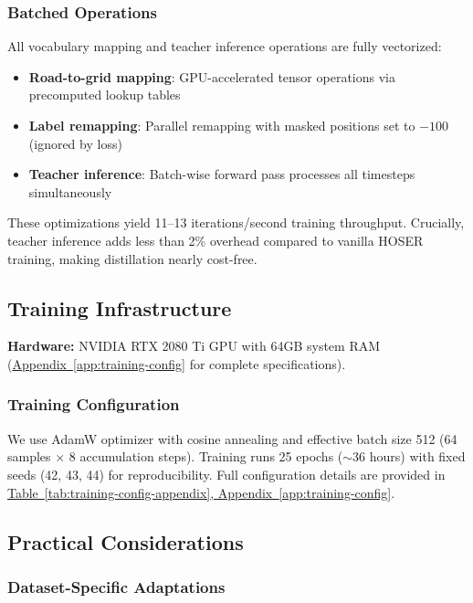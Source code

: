 \subsubsection{Batched Operations}

All vocabulary mapping and teacher inference operations are fully vectorized:

\begin{itemize}[noitemsep,topsep=0pt]
    \item \textbf{Road-to-grid mapping}: GPU-accelerated tensor operations via precomputed lookup tables
    \item \textbf{Label remapping}: Parallel remapping with masked positions set to $-100$ (ignored by loss)
    \item \textbf{Teacher inference}: Batch-wise forward pass processes all timesteps simultaneously
\end{itemize}

These optimizations yield 11--13 iterations/second training throughput. Crucially, teacher inference adds less than 2\% overhead compared to vanilla HOSER training, making distillation nearly cost-free.

\subsection{Training Infrastructure}
\label{sec:impl-infra}

\textbf{Hardware:} NVIDIA RTX 2080 Ti GPU with 64GB system RAM (\hyperref[app:training-config]{Appendix~\ref*{app:training-config}} for complete specifications).

\subsubsection{Training Configuration}

We use AdamW optimizer with cosine annealing and effective batch size 512 (64 samples $\times$ 8 accumulation steps). Training runs 25 epochs ($\sim$36 hours) with fixed seeds (42, 43, 44) for reproducibility. Full configuration details are provided in \hyperref[app:training-config]{Table~\ref*{tab:training-config-appendix}, Appendix~\ref*{app:training-config}}.

\subsection{Practical Considerations}
\label{sec:impl-practical}

\subsubsection{Dataset-Specific Adaptations}

